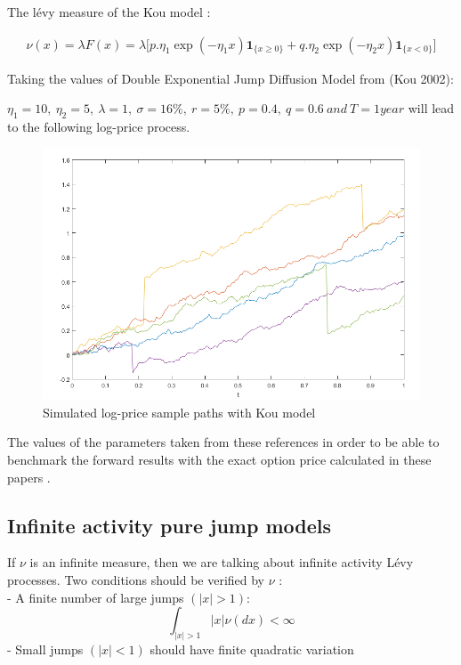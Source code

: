 \documentclass[12pt]{report}
\begin{document}
The lévy measure of the Kou model :

\begin{gather}
 \nu(x)=\lambda F(x)=\lambda \big[ p.\eta_1 \exp \left( -\eta_1 x \right) \mathbf{1}_{\{x\geqslant 0\}}+ q .\eta_2 \exp \left( -\eta_2 x \right) \mathbf{1}_{\{x < 0\}}\big]
\end{gather}

Taking the values of Double Exponential Jump Diffusion Model  from (Kou 2002):

$ \eta_1= 10,~\eta_2= 5,~\lambda=1,~\sigma= 16\%,~r=5\%,~ p=0.4,~ q=0.6 ~ and ~T=1 year $ will lead to the following log-price process.

\begin{figure}[h]

\centering
\includegraphics[scale=0.7]{kou.png} 
\caption{Simulated log-price sample paths with Kou model }
\end{figure}

The values of the parameters  taken from these  references in order to be able to benchmark the forward results  with the exact option price calculated in these papers .

\subsection{Infinite activity pure jump models}

If $\nu$ is an infinite measure, then we are talking about infinite activity Lévy processes. Two conditions should be verified by $\nu$ :\\
- A finite number of large jumps $(|x|>1)$:
$$\int_{|x|>1}|x|\nu( dx)< \infty $$
- Small jumps $(|x|< 1)$ should have finite quadratic variation 
\end{document}

